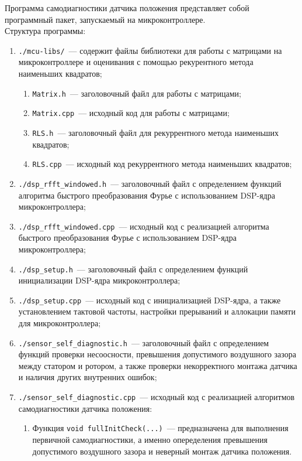 Программа самодиагностики датчика положения представляет собой программный пакет, запускаемый на микроконтроллере.\\
Структура программы:
\begin{enumerate}
    \item \verb|./mcu-libs/|~--- содержит файлы библиотеки для работы с матрицами на микроконтроллере и оценивания с помощью рекурентного метода наименьших квадратов;
    \begin{enumerate}
        \item \verb|Matrix.h|~--- заголовочный файл для работы с матрицами;
        \item \verb|Matrix.cpp|~--- исходный код для работы с матрицами;
        \item \verb|RLS.h|~--- заголовочный файл для рекуррентного метода наименьших квадратов;
        \item \verb|RLS.cpp|~--- исходный код рекуррентного метода наименьших квадратов;
    \end{enumerate}
    \item \verb|./dsp_rfft_windowed.h|~--- заголовочный файл с определением функций алгоритма быстрого преобразования Фурье с использованием DSP-ядра микроконтроллера;
    \item \verb|./dsp_rfft_windowed.cpp|~--- исходный код с реализацией алгоритма быстрого преобразования Фурье с использованием DSP-ядра микроконтроллера;
    \item \verb|./dsp_setup.h|~--- заголовочный файл с определением функций инициализации DSP-ядра микроконтроллера;
    \item \verb|./dsp_setup.cpp|~--- исходный код с инициализацией DSP-ядра, а также установлением тактовой частоты, настройки прерываний и аллокации памяти для микроконтроллера;
    \item \verb|./sensor_self_diagnostic.h|~--- заголовочный файл с определением функций проверки несоосности, превышения допустимого воздушного зазора между статором и ротором, а также проверки некорректного монтажа датчика и наличия других внутренних ошибок;
    \item \verb|./sensor_self_diagnostic.cpp|~--- исходный код с реализацией алгоритмов самодиагностики датчика положения:
    \begin{enumerate}
        \item Функция \verb|void fullInitCheck(...)|~--- предназначена для выполнения первичной самодиагностики, а именно опеределения превышения допустимого воздушного зазора и неверный монтаж датчика положения.

\end{enumerate}
\end{enumerate}
